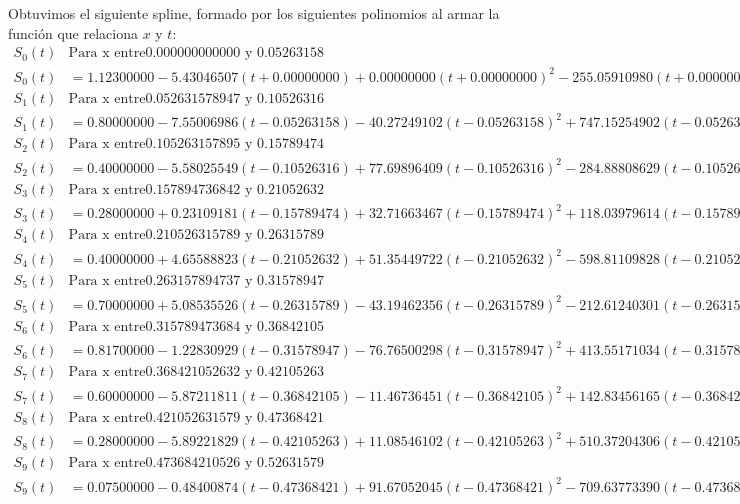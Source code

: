 Obtuvimos el siguiente spline, formado por los siguientes polinomios al armar la función que relaciona $x$ y $t$:
\begin{align*}
S_0(t) & \text{Para x entre} 0.000000000000 \text{ y } 0.05263158 \\
S_0(t) & = 1.12300000-5.43046507(t+0.00000000)+0.00000000(t+0.00000000)^2-255.05910980(t+0.00000000)^3 \\
S_1(t) & \text{Para x entre} 0.052631578947 \text{ y } 0.10526316 \\
S_1(t) & = 0.80000000-7.55006986(t-0.05263158)-40.27249102(t-0.05263158)^2+747.15254902(t-0.05263158)^3 \\
S_2(t) & \text{Para x entre} 0.105263157895 \text{ y } 0.15789474 \\
S_2(t) & = 0.40000000-5.58025549(t-0.10526316)+77.69896409(t-0.10526316)^2-284.88808629(t-0.10526316)^3 \\
S_3(t) & \text{Para x entre} 0.157894736842 \text{ y } 0.21052632 \\
S_3(t) & = 0.28000000+0.23109181(t-0.15789474)+32.71663467(t-0.15789474)^2+118.03979614(t-0.15789474)^3 \\
S_4(t) & \text{Para x entre} 0.210526315789 \text{ y } 0.26315789 \\
S_4(t) & = 0.40000000+4.65588823(t-0.21052632)+51.35449722(t-0.21052632)^2-598.81109828(t-0.21052632)^3 \\
S_5(t) & \text{Para x entre} 0.263157894737 \text{ y } 0.31578947 \\
S_5(t) & = 0.70000000+5.08535526(t-0.26315789)-43.19462356(t-0.26315789)^2-212.61240301(t-0.26315789)^3 \\
S_6(t) & \text{Para x entre} 0.315789473684 \text{ y } 0.36842105 \\
S_6(t) & = 0.81700000-1.22830929(t-0.31578947)-76.76500298(t-0.31578947)^2+413.55171034(t-0.31578947)^3 \\
S_7(t) & \text{Para x entre} 0.368421052632 \text{ y } 0.42105263 \\
S_7(t) & = 0.60000000-5.87211811(t-0.36842105)-11.46736451(t-0.36842105)^2+142.83456165(t-0.36842105)^3 \\
S_8(t) & \text{Para x entre} 0.421052631579 \text{ y } 0.47368421 \\
S_8(t) & = 0.28000000-5.89221829(t-0.42105263)+11.08546102(t-0.42105263)^2+510.37204306(t-0.42105263)^3 \\
S_9(t) & \text{Para x entre} 0.473684210526 \text{ y } 0.52631579 \\
S_9(t) & = 0.07500000-0.48400874(t-0.47368421)+91.67052045(t-0.47368421)^2-709.63773390(t-0.47368421)^3 \\

\end{align*}
